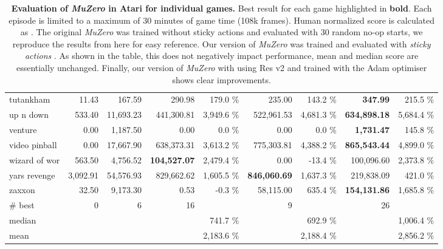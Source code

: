 \documentclass{article}
\newcommand{\muzero}{\emph{MuZero}}
\begin{document}
\begin{table}
\begin{center}
\begin{tabularx}{\textwidth}{X| r r r r r r r r}
tutankham &11.43 & 167.59 & 290.98 & 179.0 \% & 235.00 & 143.2 \% & \textbf{347.99} & 215.5 \%\\
up n down &533.40 & 11,693.23 & 441,300.81 & 3,949.6 \% & 522,961.53 & 4,681.3 \% & \textbf{634,898.18} & 5,684.4 \%\\
venture &0.00 & 1,187.50 & 0.00 & 0.0 \% & 0.00 & 0.0 \% & \textbf{1,731.47} & 145.8 \%\\
video pinball &0.00 & 17,667.90 & 638,373.31 & 3,613.2 \% & 775,303.81 & 4,388.2 \% & \textbf{865,543.44} & 4,899.0 \%\\
wizard of wor &563.50 & 4,756.52 & \textbf{104,527.07} & 2,479.4 \% & 0.00 & -13.4 \% & 100,096.60 & 2,373.8 \%\\
yars revenge &3,092.91 & 54,576.93 & 829,662.62 & 1,605.5 \% & \textbf{846,060.69} & 1,637.3 \% & 219,838.09 & 421.0 \%\\
zaxxon &32.50 & 9,173.30 & 0.53 & -0.3 \% & 58,115.00 & 635.4 \% & \textbf{154,131.86} & 1,685.8 \%\\
\midrule
\# best & 0 & 6 & 16 &  & 9 &  & 26\\
median&  &  & & 741.7 \% & & 692.9 \% & & 1,006.4 \% \\
mean&  &  & & 2,183.6 \% & & 2,188.4 \% & & 2,856.2 \% \\
\bottomrule
\end{tabularx}
\end{center}
 
\caption{
\label{tab:atari-per-level}
\textbf{Evaluation of \muzero{} in Atari for individual games.} Best result for each game highlighted in \textbf{bold}. Each episode is limited to a maximum of 30 minutes of game time (108k frames). Human normalized score is calculated as . The original \muzero{} was trained without sticky actions and evaluated with 30 random no-op starts, we reproduce the results from \cite{muzero} here for easy reference. Our version of \muzero{} was trained and evaluated with \emph{sticky actions} \cite{Marlos2017Atari}. As shown in the table, this does not negatively impact performance, mean and median score are essentially unchanged. Finally, our version of \muzero{} with using Res v2 \cite{resv2} and trained with the Adam optimiser shows clear improvements.
}
\end{table}
\end{document}
